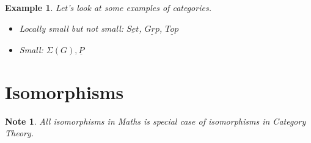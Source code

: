 \documentclass{article}
\newtheorem{example}{Example}[section]
\newtheorem{note}{Note}[section]
\begin{document}
    \vspace{0.2in}

    \begin{example}
        Let's look at some examples of categories.

        \begin{itemize}
            \item Locally small but not small: $\underline{Set}$, $\underline{Grp}$, $\underline{Top}$
            \item Small: $\Sigma(G), \underline{P}$
        \end{itemize}
    \end{example}


    \section{Isomorphisms}

    \begin{note}
        All isomorphisms in Maths is special case of isomorphisms in Category Theory.
    \end{note}
\end{document}
